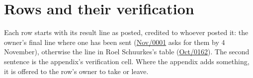 \providecommand{\aevmsg}[2]{\href{https://lists.w3.org/Archives/Public/public-agent-conformance/2026#1/#2.html}{#1/#2}}
\providecommand{\aevreadrelease}{0.32.1}

\section{Rows and their verification}
\label{sec:w3c-rows}

Each row starts with its result line as posted, credited to whoever posted it: the owner's final line where one has been sent (\aevmsg{Nov}{0001} asks for them by 4 November), otherwise the line in Roel Schuurkes's table (\aevmsg{Oct}{0162}). The second sentence is the appendix's verification cell. Where the appendix adds something, it is offered to the row's owner to take or leave.


